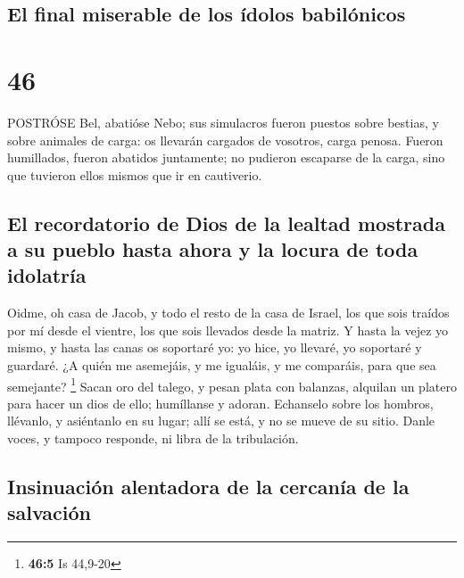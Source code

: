 \hypertarget{el-final-miserable-de-los-uxeddolos-babiluxf3nicos}{%
\subsection{El final miserable de los ídolos
babilónicos}\label{el-final-miserable-de-los-uxeddolos-babiluxf3nicos}}

\hypertarget{section-45}{%
\section{46}\label{section-45}}

 POSTRÓSE Bel, abatióse Nebo; sus simulacros fueron puestos
sobre bestias, y sobre animales de carga: os llevarán cargados de
vosotros, carga penosa.  Fueron humillados, fueron abatidos
juntamente; no pudieron escaparse de la carga, sino que tuvieron ellos
mismos que ir en cautiverio.

\hypertarget{el-recordatorio-de-dios-de-la-lealtad-mostrada-a-su-pueblo-hasta-ahora-y-la-locura-de-toda-idolatruxeda}{%
\subsection{El recordatorio de Dios de la lealtad mostrada a su pueblo
hasta ahora y la locura de toda
idolatría}\label{el-recordatorio-de-dios-de-la-lealtad-mostrada-a-su-pueblo-hasta-ahora-y-la-locura-de-toda-idolatruxeda}}

 Oidme, oh casa de Jacob, y todo el resto de la casa de
Israel, los que sois traídos por mí desde el vientre, los que sois
llevados desde la matriz.  Y hasta la vejez yo mismo, y
hasta las canas os soportaré yo: yo hice, yo llevaré, yo soportaré y
guardaré.  ¿A quién me asemejáis, y me igualáis, y me
comparáis, para que sea semejante? \footnote{\textbf{46:5} Is 44,9-20}
 Sacan oro del talego, y pesan plata con balanzas, alquilan
un platero para hacer un dios de ello; humíllanse y adoran. 
Echanselo sobre los hombros, llévanlo, y asiéntanlo en su lugar; allí se
está, y no se mueve de su sitio. Danle voces, y tampoco responde, ni
libra de la tribulación.

\hypertarget{insinuaciuxf3n-alentadora-de-la-cercanuxeda-de-la-salvaciuxf3n}{%
\subsection{Insinuación alentadora de la cercanía de la
salvación}\label{insinuaciuxf3n-alentadora-de-la-cercanuxeda-de-la-salvaciuxf3n}}

